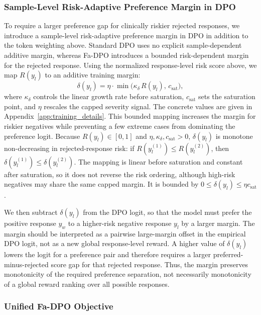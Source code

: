 \documentclass[a4paper,fleqn,doubleblind]{cas-sc}
\begin{document}
\subsubsection{Sample-Level Risk-Adaptive Preference Margin in DPO}
\label{sec:sample_margin}
To require a larger preference gap for clinically riskier rejected responses, we introduce a sample-level risk-adaptive preference margin in DPO in addition to the token weighting above. Standard DPO uses no explicit sample-dependent additive margin, whereas Fa-DPO introduces a bounded risk-dependent margin for the rejected response. Using the normalized response-level risk score above, we map $R(y_l)$ to an additive training margin:
\begin{equation}
\label{eq:severity_margin}
\delta(y_l)=\eta \cdot \min \big( \kappa_{\delta} \, R(y_l), \, c_{\text{sat}} \big),
\end{equation}
where $\kappa_{\delta}$ controls the linear growth rate before saturation, $c_{\text{sat}}$ sets the saturation point, and $\eta$ rescales the capped severity signal. The concrete values are given in Appendix~\ref{app:training_details}. This bounded mapping increases the margin for riskier negatives while preventing a few extreme cases from dominating the preference logit.
Because $R(y_l)\in[0,1]$ and $\eta,\kappa_{\delta},c_{\text{sat}}>0$, $\delta(y_l)$ is monotone non-decreasing in rejected-response risk: if $R(y_l^{(1)})\le R(y_l^{(2)})$, then $\delta(y_l^{(1)})\le\delta(y_l^{(2)})$. The mapping is linear before saturation and constant after saturation, so it does not reverse the risk ordering, although high-risk negatives may share the same capped margin. It is bounded by $0\le\delta(y_l)\le\eta c_{\text{sat}}$.

We then subtract $\delta(y_l)$ from the DPO logit, so that the model must prefer the positive response $y_w$ to a higher-risk negative response $y_l$ by a larger margin.
The margin should be interpreted as a pairwise large-margin offset in the empirical DPO logit, not as a new global response-level reward. A higher value of $\delta(y_l)$ lowers the logit for a preference pair and therefore requires a larger preferred-minus-rejected score gap for that rejected response. Thus, the margin preserves monotonicity of the required preference separation, not necessarily monotonicity of a global reward ranking over all possible responses.

\subsubsection{Unified Fa-DPO Objective}
\end{document}

